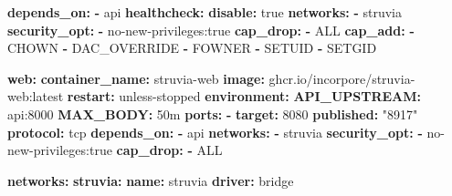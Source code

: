 \documentclass[
  10pt,
]{article}
\newenvironment{Shaded}{\begin{snugshade}}{\end{snugshade}}
\newcommand{\AttributeTok}[1]{\textcolor[rgb]{0.13,0.29,0.53}{#1}}
\newcommand{\CharTok}[1]{\textcolor[rgb]{0.31,0.60,0.02}{#1}}
\newcommand{\DecValTok}[1]{\textcolor[rgb]{0.00,0.00,0.81}{#1}}
\newcommand{\FunctionTok}[1]{\textcolor[rgb]{0.13,0.29,0.53}{\textbf{#1}}}
\newcommand{\KeywordTok}[1]{\textcolor[rgb]{0.13,0.29,0.53}{\textbf{#1}}}
\newcommand{\StringTok}[1]{\textcolor[rgb]{0.31,0.60,0.02}{#1}}
\begin{document}
\begin{Shaded}
\begin{Highlighting}[]
\AttributeTok{    }\FunctionTok{depends\_on}\KeywordTok{:}
\AttributeTok{      }\KeywordTok{{-}}\AttributeTok{ api}
\AttributeTok{    }\FunctionTok{healthcheck}\KeywordTok{:}
\AttributeTok{      }\FunctionTok{disable}\KeywordTok{:}\AttributeTok{ }\CharTok{true}
\AttributeTok{    }\FunctionTok{networks}\KeywordTok{:}
\AttributeTok{      }\KeywordTok{{-}}\AttributeTok{ struvia}
\AttributeTok{    }\FunctionTok{security\_opt}\KeywordTok{:}
\AttributeTok{      }\KeywordTok{{-}}\AttributeTok{ no{-}new{-}privileges:true}
\AttributeTok{    }\FunctionTok{cap\_drop}\KeywordTok{:}
\AttributeTok{      }\KeywordTok{{-}}\AttributeTok{ ALL}
\AttributeTok{    }\FunctionTok{cap\_add}\KeywordTok{:}
\AttributeTok{      }\KeywordTok{{-}}\AttributeTok{ CHOWN}
\AttributeTok{      }\KeywordTok{{-}}\AttributeTok{ DAC\_OVERRIDE}
\AttributeTok{      }\KeywordTok{{-}}\AttributeTok{ FOWNER}
\AttributeTok{      }\KeywordTok{{-}}\AttributeTok{ SETUID}
\AttributeTok{      }\KeywordTok{{-}}\AttributeTok{ SETGID}

\AttributeTok{  }\FunctionTok{web}\KeywordTok{:}
\AttributeTok{    }\FunctionTok{container\_name}\KeywordTok{:}\AttributeTok{ struvia{-}web}
\AttributeTok{    }\FunctionTok{image}\KeywordTok{:}\AttributeTok{ ghcr.io/incorpore/struvia{-}web:latest}
\AttributeTok{    }\FunctionTok{restart}\KeywordTok{:}\AttributeTok{ unless{-}stopped}
\AttributeTok{    }\FunctionTok{environment}\KeywordTok{:}
\AttributeTok{      }\FunctionTok{API\_UPSTREAM}\KeywordTok{:}\AttributeTok{ api:8000}
\AttributeTok{      }\FunctionTok{MAX\_BODY}\KeywordTok{:}\AttributeTok{ 50m}
\AttributeTok{    }\FunctionTok{ports}\KeywordTok{:}
\AttributeTok{      }\KeywordTok{{-}}\AttributeTok{ }\FunctionTok{target}\KeywordTok{:}\AttributeTok{ }\DecValTok{8080}
\AttributeTok{        }\FunctionTok{published}\KeywordTok{:}\AttributeTok{ }\StringTok{"8917"}
\AttributeTok{        }\FunctionTok{protocol}\KeywordTok{:}\AttributeTok{ tcp}
\AttributeTok{    }\FunctionTok{depends\_on}\KeywordTok{:}
\AttributeTok{      }\KeywordTok{{-}}\AttributeTok{ api}
\AttributeTok{    }\FunctionTok{networks}\KeywordTok{:}
\AttributeTok{      }\KeywordTok{{-}}\AttributeTok{ struvia}
\AttributeTok{    }\FunctionTok{security\_opt}\KeywordTok{:}
\AttributeTok{      }\KeywordTok{{-}}\AttributeTok{ no{-}new{-}privileges:true}
\AttributeTok{    }\FunctionTok{cap\_drop}\KeywordTok{:}
\AttributeTok{      }\KeywordTok{{-}}\AttributeTok{ ALL}

\FunctionTok{networks}\KeywordTok{:}
\AttributeTok{  }\FunctionTok{struvia}\KeywordTok{:}
\AttributeTok{    }\FunctionTok{name}\KeywordTok{:}\AttributeTok{ struvia}
\AttributeTok{    }\FunctionTok{driver}\KeywordTok{:}\AttributeTok{ bridge}


\end{Highlighting}
\end{Shaded}
\end{document}

